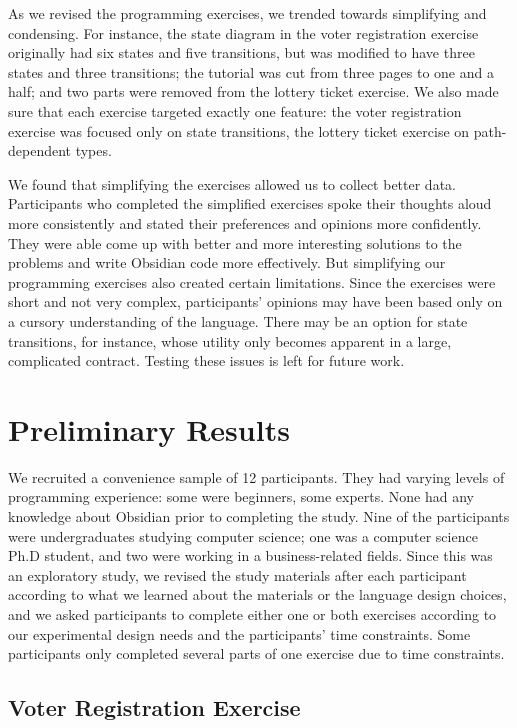 \documentclass[sigplan,10pt,review]{acmart}\settopmatter{printfolios=true}
\begin{document}
As we revised the programming exercises, we trended towards simplifying and condensing. For instance, the state diagram in 
the voter registration exercise originally had six states and five transitions, but was modified to have three states and three 
transitions; the tutorial was cut from three pages to one and a half; and two parts were removed from the lottery ticket exercise. 
We also made sure that each exercise targeted exactly one feature: the voter registration exercise was focused only on state 
transitions, the lottery ticket exercise on path-dependent types. 

We found that simplifying the exercises allowed us to collect better data. Participants who completed the simplified exercises 
spoke their thoughts aloud more consistently and stated their preferences and opinions more confidently. They were able
come up with better and more interesting solutions to the problems and write Obsidian code more effectively. 
But simplifying our programming exercises also created certain limitations. Since the exercises were short and not very 
complex, participants' opinions may have been based only on a cursory understanding of the language. There may be an option 
for state transitions, for instance, whose utility only becomes apparent in a large, complicated contract. 
Testing these issues is left for future work.

\section{Preliminary Results}

We recruited a convenience sample of 12 participants. They had varying levels of programming experience: some were beginners, some 
experts. None had any knowledge about Obsidian prior to completing the study. Nine of the participants were undergraduates 
studying computer science; one was a computer science Ph.D student, and two were working in a business-related fields. Since this was an exploratory study, we revised the study materials after each participant according to what we learned about the materials or the language design choices, and we asked participants to complete either one or both exercises according to our experimental design needs and the participants' time constraints. Some participants only completed several parts of one exercise due to time constraints. 

\subsection{Voter Registration Exercise}
\end{document}
